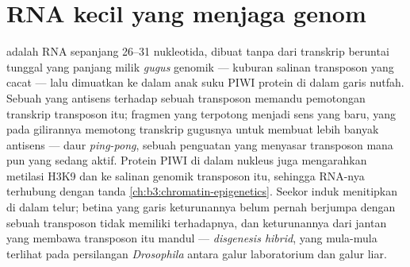 \section{RNA kecil yang menjaga genom}

\begin{definition}\label{def:b3:rna-regulation:pirna}
\emph{} adalah RNA sepanjang \numrange{26}{31} nukleotida, dibuat tanpa
 dari transkrip beruntai tunggal yang panjang milik \emph{gugus }
genomik --- kuburan salinan transposon yang cacat --- lalu dimuatkan ke dalam
anak suku PIWI protein  di dalam garis nutfah. Sebuah  yang
antisens terhadap sebuah transposon memandu pemotongan transkrip transposon
itu; fragmen yang terpotong menjadi  sens yang baru, yang pada gilirannya
memotong transkrip gugusnya untuk membuat lebih banyak  antisens ---
daur \emph{ping-pong}, sebuah penguatan yang menyasar transposon mana pun yang
sedang aktif. Protein PIWI di dalam nukleus juga mengarahkan metilasi H3K9 dan
 ke salinan genomik transposon itu, sehingga RNA-nya terhubung
dengan tanda  \cref{ch:b3:chromatin-epigenetics}. Seekor induk
menitipkan  di dalam telur; betina yang garis keturunannya belum
pernah berjumpa dengan sebuah transposon tidak memiliki  terhadapnya,
dan keturunannya dari jantan yang membawa transposon itu mandul ---
\emph{disgenesis hibrid}, yang mula-mula terlihat pada persilangan
\emph{Drosophila} antara galur laboratorium dan galur liar.
\end{definition}

